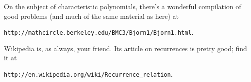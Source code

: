 \documentclass[12pt,letterpaper]{article}
\begin{document}
On the subject of characteristic polynomials, there's a wonderful
compilation of good problems (and much of the same material as here)
at
\begin{center}\texttt{http://mathcircle.berkeley.edu/BMC3/Bjorn1/Bjorn1.html}.\end{center}

Wikipedia is, as always, your friend. Its article on recurrences
is pretty good; find it at
\begin{center}\texttt{http://en.wikipedia.org/wiki/Recurrence\string_relation}.\end{center}
\end{document}
